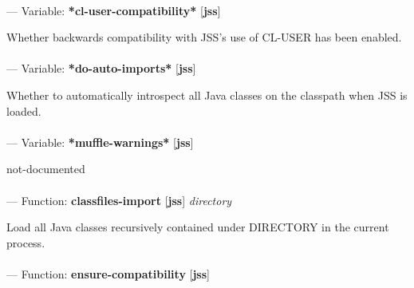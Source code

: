 \paragraph{}
\label{JSS:*CL-USER-COMPATIBILITY*}
--- Variable: \textbf{*cl-user-compatibility*} [\textbf{jss}] \textit{}

\begin{adjustwidth}{5em}{5em}
Whether backwards compatibility with JSS's use of CL-USER has been enabled.
\end{adjustwidth}

\paragraph{}
\label{JSS:*DO-AUTO-IMPORTS*}
--- Variable: \textbf{*do-auto-imports*} [\textbf{jss}] \textit{}

\begin{adjustwidth}{5em}{5em}
Whether to automatically introspect all Java classes on the classpath when JSS is loaded.
\end{adjustwidth}

\paragraph{}
\label{JSS:*MUFFLE-WARNINGS*}
--- Variable: \textbf{*muffle-warnings*} [\textbf{jss}] \textit{}

\begin{adjustwidth}{5em}{5em}
not-documented
\end{adjustwidth}

\paragraph{}
\label{JSS:CLASSFILES-IMPORT}
--- Function: \textbf{classfiles-import} [\textbf{jss}] \textit{directory}

\begin{adjustwidth}{5em}{5em}
Load all Java classes recursively contained under DIRECTORY in the current process.
\end{adjustwidth}

\paragraph{}
\label{JSS:ENSURE-COMPATIBILITY}
--- Function: \textbf{ensure-compatibility} [\textbf{jss}] \textit{}

